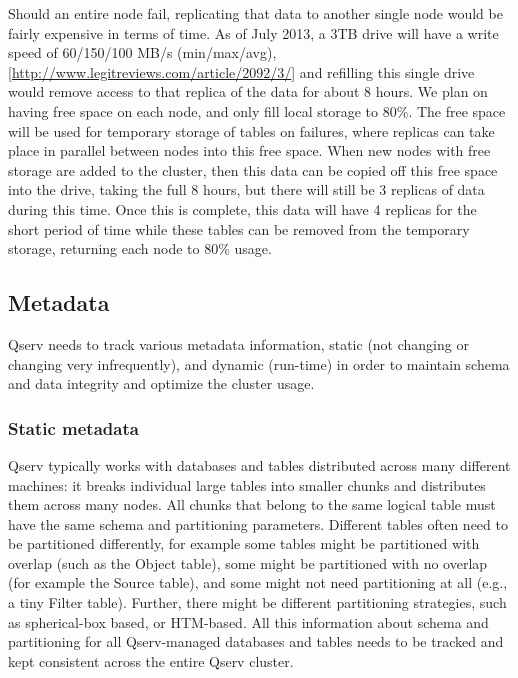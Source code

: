 \documentclass[DM,lsstdraft,toc]{lsstdoc}
\begin{document}
Should an entire node fail, replicating that data to another single node
would be fairly expensive in terms of time. As of July 2013, a 3TB drive
will have a write speed of 60/150/100 MB/s (min/max/avg),
{[}\url{http://www.legitreviews.com/article/2092/3/}{]} and refilling
this single drive would remove access to that replica of the data for
about 8 hours. We plan on having free space on each node, and only fill
local storage to 80\%. The free space will be used for temporary storage
of tables on failures, where replicas can take place in parallel between
nodes into this free space. When new nodes with free storage are added
to the cluster, then this data can be copied off this free space into
the drive, taking the full 8 hours, but there will still be 3 replicas
of data during this time. Once this is complete, this data will have 4
replicas for the short period of time while these tables can be removed
from the temporary storage, returning each node to 80\% usage.

\subsection{Metadata}\label{metadata}

Qserv needs to track various metadata information, static (not changing
or changing very infrequently), and dynamic (run-time) in order to
maintain schema and data integrity and optimize the cluster usage.

\subsubsection{Static metadata}\label{static-metadata}

Qserv typically works with databases and tables distributed across many
different machines: it breaks individual large tables into smaller
chunks and distributes them across many nodes. All chunks that belong to
the same logical table must have the same schema and partitioning
parameters. Different tables often need to be partitioned differently,
for example some tables might be partitioned with overlap (such as the
Object table), some might be partitioned with no overlap (for example
the Source table), and some might not need partitioning at all (e.g., a
tiny Filter table). Further, there might be different partitioning
strategies, such as spherical-box based, or HTM-based. All this
information about schema and partitioning for all Qserv-managed
databases and tables needs to be tracked and kept consistent across the
entire Qserv cluster.
\end{document}
